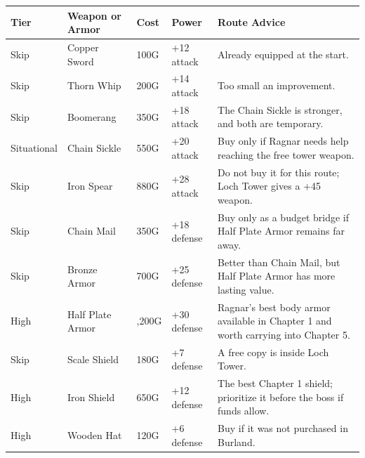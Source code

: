 \documentclass[
  american,
  10pt,
  letterpaper,
  oneside,
  open=any]{scrreprt}
\newcounter{none} %
\newenvironment{guidetable}{%
  \small\setstretch{1.0}%
  \setlength{\tabcolsep}{4pt}%
  \setlength{\LTpre}{8pt}\setlength{\LTpost}{10pt}%
  \renewcommand{\arraystretch}{1.16}%
}{ }
\begin{document}
\begin{guidetable}

{\def\LTcaptype{none} %
\begin{longtable}[]{@{}
  >{\raggedright\arraybackslash}p{}
  >{\raggedright\arraybackslash}p{}
  >{\raggedleft\arraybackslash}p{}
  >{\raggedleft\arraybackslash}p{}
  >{\raggedright\arraybackslash}p{}@{}}
\toprule\noalign{}
\begin{minipage}[b]{\linewidth}\raggedright
\color{GuideGreen}\bfseries Tier
\end{minipage} & \begin{minipage}[b]{\linewidth}\raggedright
\color{GuideGreen}\bfseries Weapon or Armor
\end{minipage} & \begin{minipage}[b]{\linewidth}\raggedleft
\color{GuideGreen}\bfseries Cost
\end{minipage} & \begin{minipage}[b]{\linewidth}\raggedleft
\color{GuideGreen}\bfseries Power
\end{minipage} & \begin{minipage}[b]{\linewidth}\raggedright
\color{GuideGreen}\bfseries Route Advice
\end{minipage} \\
\midrule\noalign{}
\endhead
\bottomrule\noalign{}
\endlastfoot
Skip & Copper Sword & 100G & +12 attack & Already equipped at the
start. \\
Skip & Thorn Whip & 200G & +14 attack & Too small an improvement. \\
Skip & Boomerang & 350G & +18 attack & The Chain Sickle is stronger, and
both are temporary. \\
Situational & Chain Sickle & 550G & +20 attack & Buy only if Ragnar
needs help reaching the free tower weapon. \\
Skip & Iron Spear & 880G & +28 attack & Do not buy it for this route;
Loch Tower gives a +45 weapon. \\
Skip & Chain Mail & 350G & +18 defense & Buy only as a budget bridge if
Half Plate Armor remains far away. \\
Skip & Bronze Armor & 700G & +25 defense & Better than Chain Mail, but
Half Plate Armor has more lasting value. \\
High & Half Plate Armor & 1,200G & +30 defense & Ragnar's best body
armor available in Chapter 1 and worth carrying into Chapter 5. \\
Skip & Scale Shield & 180G & +7 defense & A free copy is inside Loch
Tower. \\
High & Iron Shield & 650G & +12 defense & The best Chapter 1 shield;
prioritize it before the boss if funds allow. \\
High & Wooden Hat & 120G & +6 defense & Buy if it was not purchased in
Burland. \\
\end{longtable}
}

\end{guidetable}
\end{document}
